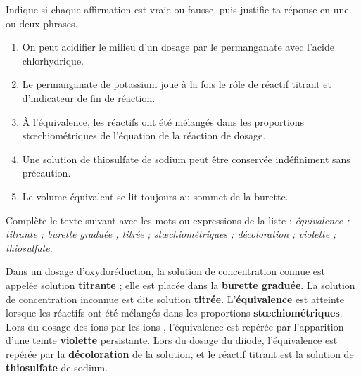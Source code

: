 \documentclass[11pt]{article}
\begin{document}
\begin{exercice}
Indique si chaque affirmation est vraie ou fausse, puis justifie ta réponse en une ou deux phrases.
\begin{enumerate}
\item On peut acidifier le milieu d'un dosage par le permanganate avec l'acide chlorhydrique.
\item Le permanganate de potassium joue à la fois le rôle de réactif titrant et d'indicateur de fin de réaction.
\item À l'équivalence, les réactifs ont été mélangés dans les proportions stœchiométriques de l'équation de la réaction de dosage.
\item Une solution de thiosulfate de sodium peut être conservée indéfiniment sans précaution.
\item Le volume équivalent se lit toujours au sommet de la burette.
\end{enumerate}
\end{exercice}

\begin{exercice}
Complète le texte suivant avec les mots ou expressions de la liste : \emph{équivalence ; titrante ; burette graduée ; titrée ; stœchiométriques ; décoloration ; violette ; thiosulfate}.

\medskip
Dans un dosage d'oxydoréduction, la solution de concentration connue est appelée solution \textbf{titrante} ; elle est placée dans la \textbf{burette graduée}. La solution de concentration inconnue est dite solution \textbf{titrée}. L'\textbf{équivalence} est atteinte lorsque les réactifs ont été mélangés dans les proportions \textbf{stœchiométriques}. Lors du dosage des ions  par les ions , l'équivalence est repérée par l'apparition d'une teinte \textbf{violette} persistante. Lors du dosage du diiode, l'équivalence est repérée par la \textbf{décoloration} de la solution, et le réactif titrant est la solution de \textbf{thiosulfate} de sodium.
\end{exercice}
\end{document}

